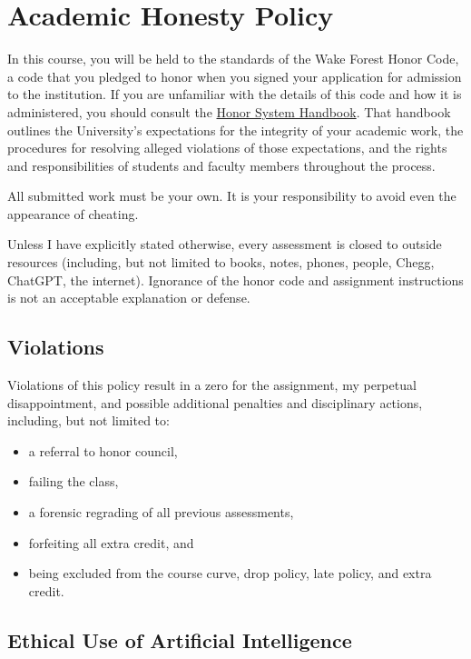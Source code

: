\documentclass[
]{book}
\providecommand{\tightlist}{%
  \setlength{\itemsep}{0pt}\setlength{\parskip}{0pt}}
\begin{document}
\chapter{Academic Honesty Policy}\label{academic-honesty-policy}

In this course, you will be held to the standards of the Wake Forest Honor Code, a code that you pledged to honor when you signed your application for admission to the institution.
If you are unfamiliar with the details of this code and how it is administered, you should consult the \href{https://studentconduct.wfu.edu/honor-system-wfu/}{Honor System Handbook}.
That handbook outlines the University's expectations for the integrity of your academic work, the procedures for resolving alleged violations of those expectations, and the rights and responsibilities of students and faculty members throughout the process.

All submitted work must be your own. It is your responsibility to avoid even the appearance of cheating.

Unless I have explicitly stated otherwise, every assessment is closed to outside resources (including, but not limited to books, notes, phones, people, Chegg, ChatGPT, the internet). Ignorance of the honor code and assignment instructions is not an acceptable explanation or defense.

\section{Violations}\label{violations}

Violations of this policy result in a zero for the assignment, my perpetual disappointment, and possible additional penalties and disciplinary actions, including, but not limited to:

\begin{itemize}
\tightlist
\item
  a referral to honor council,
\item
  failing the class,
\item
  a forensic regrading of all previous assessments,
\item
  forfeiting all extra credit, and
\item
  being excluded from the course curve, drop policy, late policy, and extra credit.
\end{itemize}

\section{Ethical Use of Artificial Intelligence}\label{ethical-use-of-artificial-intelligence}
\end{document}
